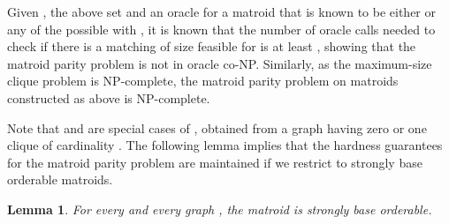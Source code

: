 \documentclass[letterpaper,11pt]{article}
\newtheorem{lemma}[theorem]{Lemma}
\theoremstyle{definition}
\begin{document}
Given , the above set  and an oracle for a matroid  that is known to be either  or any of the possible  with , it is known that the number of oracle calls needed to check if there is a matching of size  feasible for  is at least , showing that the matroid parity problem is not in oracle co-NP. Similarly, as the maximum-size clique problem is NP-complete, the matroid parity problem on matroids  constructed as above is NP-complete.

Note that  and  are special cases of , obtained from a graph having zero or one clique of cardinality . The following lemma implies that the hardness guarantees for the matroid parity problem are maintained if we restrict to strongly base orderable matroids.

\begin{lemma}\label{lem:lemsbo}
  For every  and every graph , the matroid  is strongly base orderable.
\end{lemma}
\end{document}
